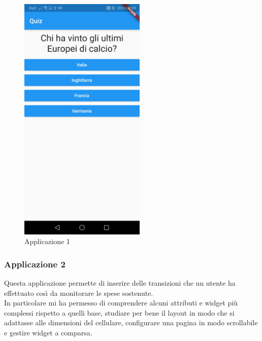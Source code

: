 \begin{figure}[htbp]	
	\centering
	\includegraphics[width=6cm]{immagini/app1.jpeg}
	\caption{Applicazione 1}
	\label{fig:Applicazione 1}
\end{figure}

\newpage

\subsubsection{Applicazione 2}
Questa applicazione permette di inserire delle transizioni che un utente ha effettuato così da monitorare le spese sostenute.\\
In particolare mi ha permesso di comprendere alcuni attributi e widget più complessi rispetto a quelli base, studiare per bene il layout in modo che si adattasse alle dimensioni del cellulare, configurare una pagina in modo scrollabile e gestire widget a comparsa.\\

